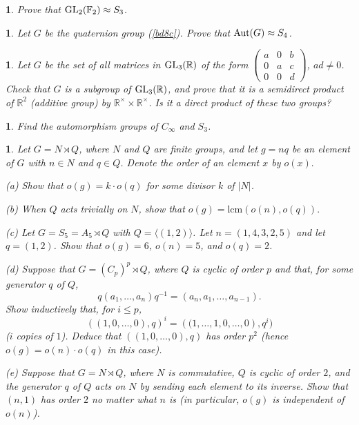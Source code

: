 \documentclass[a4paper,11pt,final]{memoir}%
\newtheorem{exercise}[Y]{}
\theoremstyle{nonumberplain}
\begin{document}
\begin{exercise}
\label{x16} Prove that $\operatorname{GL}_{2}(\mathbb{F}_{2}\mathbb{)}\approx S_{3}$.
\end{exercise}

\begin{exercise}
\label{x17} Let $G$ be the quaternion group (\ref{bd8c}). Prove that
$\operatorname{Aut}(G)\approx S_{4}$.

\end{exercise}

\begin{exercise}
\label{x18} Let $G$ be the set of all matrices in $\operatorname{GL}_{3}(\mathbb{R})$ of the
form $\left(
\begin{smallmatrix}
a & 0 & b\\
0 & a & c\\
0 & 0 & d
\end{smallmatrix}
\right)  $, $ad\neq0$. Check that $G$ is a subgroup of $\operatorname{GL}_{3}(\mathbb{R})$,
and prove that it is a semidirect product of $\mathbb{R}^{2}$ (additive group)
by $\mathbb{R}^{\times}\times\mathbb{R}^{\times}$. Is it a direct product of
these two groups?


\end{exercise}

\begin{exercise}
\label{x19} Find the automorphism groups of $C_{\infty}$ and $S_{3}$.

\end{exercise}

\begin{exercise}
\label{x19a}Let $G=N\rtimes Q$, where $N$ and $Q$ are finite groups, and let
$g=nq$ be an element of $G$ with $n\in N$ and $q\in Q$. Denote the order of an
element $x$ by $o(x).$

(a) Show that $o(g)=k\cdot o(q)$ for some divisor $k$ of $|N|$.

(b) When $Q$ acts trivially on $N$, show that $o(g)=\mathrm{lcm}(o(n),o(q)).$

(c) Let $G=S_{5}=A_{5}\rtimes Q$ with $Q=\langle(1,2)\rangle$. Let
$n=(1,4,3,2,5)$ and let $q=(1,2)$. Show that $o(g)=6$, $o(n)=5$, and $o(q)=2$.

(d) Suppose that $G=(C_{p})^{p}\rtimes Q$, where $Q$ is cyclic of order $p$
and that, for some generator $q$ of $Q$,%
\[
q(a_{1},\ldots,a_{n})q^{-1}=(a_{n},a_{1},\ldots,a_{n-1}).
\]
Show inductively that, for $i\leq p$,%
\[
\left(  (1,0,\ldots,0),q\right)  ^{i}=\left(  (1,\ldots,1,0,\ldots,0\right)
,q^{i})
\]
($i$ copies of $1$). Deduce that $\left(  (1,0,\ldots,0),q\right)  $ has order
$p^{2}$ (hence $o(g)=o(n)\cdot o(q)$ in this case).

(e) Suppose that $G=N\rtimes Q$, where $N$ is commutative, $Q$ is cyclic of
order $2$, and the generator $q$ of $Q$ acts on $N$ by sending each element to
its inverse. Show that $(n,1)$ has order $2$ no matter what $n$ is (in
particular, $o(g)$ is independent of $o(n)$).

\end{exercise}
\end{document}
